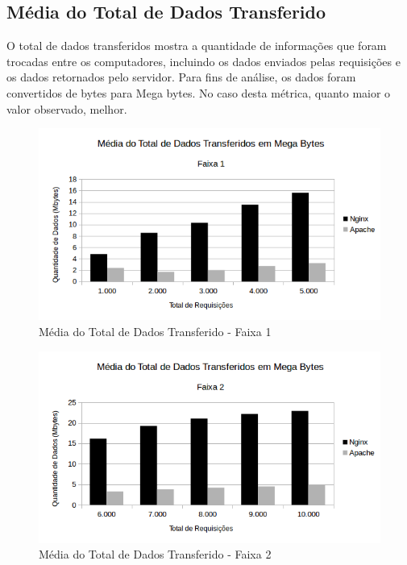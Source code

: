 \subsection{Média do Total de Dados Transferido}
O total de dados transferidos mostra a quantidade de informações que foram 
trocadas entre os computadores, incluindo os dados enviados pelas requisições e 
os dados retornados pelo servidor. Para fins de análise, os dados foram 
convertidos de bytes para Mega bytes. No caso desta métrica, quanto maior o 
valor observado, melhor.

\begin{figure}[H]
	\centering
	\includegraphics[width=1\linewidth]{graficos/grafico2-f1} 
	\caption{Média do Total de Dados Transferido - Faixa 1}
	\label{fig:grafico2-f1}
\end{figure}

\begin{figure}[H]
	\centering
	\includegraphics[width=1\linewidth]{graficos/grafico2-f2} 
	\caption{Média do Total de Dados Transferido - Faixa 2}
	\label{fig:grafico2-f2}
\end{figure}

